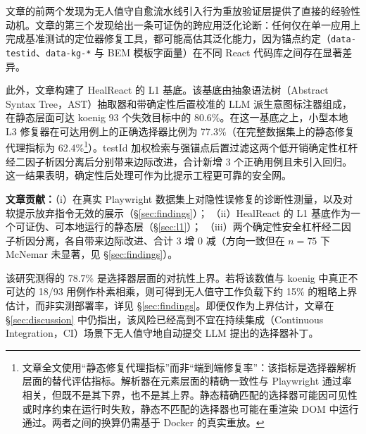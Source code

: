 \noindent 文章的前两个发现为无人值守自愈流水线引入行为重放验证层提供了直接的经验性动机。文章的第三个发现给出一条可证伪的跨应用泛化论断：任何仅在单一应用上完成基准测试的定位器修复工具，都可能高估其泛化能力，因为锚点约定（\texttt{data-testid}、\texttt{data-kg-*} 与 BEM 模板字面量）在不同 React 代码库之间存在显著差异。

此外，文章构建了 HealReact 的 L1 基底。该基底由抽象语法树（Abstract Syntax Tree，AST）抽取器和带确定性后置校准的 LLM 派生意图标注器组成，在静态层面可达 koenig 93 个失效目标中的 80.6\%。在这一基底之上，小型本地 L3 修复器在可达用例上的正确选择器比例为 77.3\%（在完整数据集上的静态修复代理指标为 62.4\%\footnote{文章全文使用“静态修复代理指标”而非“端到端修复率”：该指标是选择器解析层面的替代评估指标。解析器在元素层面的精确一致性与 Playwright 通过率相关，但既不是其下界，也不是其上界。静态精确匹配的选择器可能因可见性或时序约束在运行时失败，静态不匹配的选择器也可能在重渲染 DOM 中运行通过。两者之间的换算仍需基于 Docker 的真实重放。}）。testId 加权检索与强锚点后置过滤这两个低开销确定性杠杆经二因子析因分离后分别带来边际改进，合计新增 3 个正确用例且未引入回归。这一结果表明，确定性后处理可作为比提示工程更可靠的安全网。

\noindent\textbf{文章贡献：}（i）在真实 Playwright 数据集上对隐性误修复的诊断性测量，以及对软提示放弃指令无效的展示（\S\ref{sec:findings}）；
（ii）HealReact 的 L1 基底作为一个可证伪、可本地运行的静态层（\S\ref{sec:l1}）；
（iii）两个确定性安全杠杆经二因子析因分离，各自带来边际改进、合计 3 增 0 减（方向一致但在 $n=75$ 下 McNemar 未显著，见 \S\ref{sec:findings}）。

该研究测得的 78.7\% 是选择器层面的对抗性上界。若将该数值与 koenig 中真正不可达的 18/93 用例作朴素相乘，则可得到无人值守工作负载下约 15\% 的粗略上界估计，而非实测部署率，详见 \S\ref{sec:findings}。即便仅作为上界估计，文章在 \S\ref{sec:discussion} 中仍指出，该风险已经高到不宜在持续集成（Continuous Integration，CI）场景下无人值守地自动提交 LLM 提出的选择器补丁。
